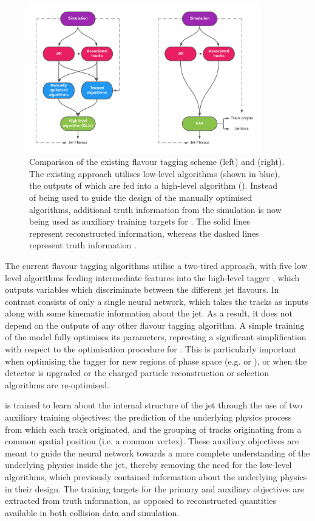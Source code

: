 \begin{figure}[!htbp]
    \centering
    \includegraphics[width=0.9\textwidth]{chapters/gnn_tagger/figs/GNN_compare_contrast.pdf}
    \caption{Comparison of the existing flavour tagging scheme (left) and \GNN (right). The existing approach utilises low-level algorithms (shown in blue), the outputs of which are fed into a high-level algorithm (\DLr). Instead of being used to guide the design of the manually optimised algorithms, additional truth information from the simulation is now being used as auxiliary training targets for \GNN. The solid lines represent reconstructed information, whereas the dashed lines represent truth information \cite{ATL-PHYS-PUB-2022-027}.}
    \label{fig:oldvsnew}
\end{figure}

The current flavour tagging algorithms utilise a two-tired approach, with five low level algorithms feeding intermediate features into the high-level tagger \DLr, which outputs variables which discriminate between the different jet flavours.
In contrast \GNN consists of only a single neural network, which takes the tracks as inputs along with some kinematic information about the jet.
As a result, it does not depend on the outputs of any other flavour tagging algorithm.
A simple training of the model fully optimises its parameters, represting a significant simplification with respect to the optimisation procedure for \DLr.
This is particularly important when optimising the tagger for new regions of phase space (e.g. \ctag or \highpt \btag), or when the detector is upgraded or the charged particle reconstruction or selection algorithms are re-optimised.

\GNN is trained to learn about the internal structure of the jet through the use of two auxiliary training objectives: the prediction of the underlying physics process from which each track originated, and the grouping of tracks originating from a common spatial position (i.e. a common vertex).
These auxiliary objectives are meant to guide the neural network towards a more complete understanding of the underlying physics inside the jet, thereby removing the need for the low-level algorithms, which previously contained information about the underlying physics in their design.
The training targets for the primary and auxiliary objectives are extracted from truth information, as opposed to reconstructed quantities available in both collision data and simulation.

